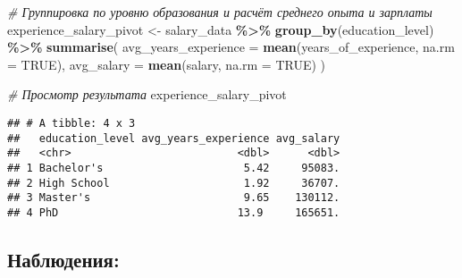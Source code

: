 \documentclass[
]{article}
\newenvironment{Shaded}{\begin{snugshade}}{\end{snugshade}}
\newcommand{\AttributeTok}[1]{\textcolor[rgb]{0.13,0.29,0.53}{#1}}
\newcommand{\CommentTok}[1]{\textcolor[rgb]{0.56,0.35,0.01}{\textit{#1}}}
\newcommand{\ConstantTok}[1]{\textcolor[rgb]{0.56,0.35,0.01}{#1}}
\newcommand{\FunctionTok}[1]{\textcolor[rgb]{0.13,0.29,0.53}{\textbf{#1}}}
\newcommand{\NormalTok}[1]{#1}
\newcommand{\OtherTok}[1]{\textcolor[rgb]{0.56,0.35,0.01}{#1}}
\newcommand{\SpecialCharTok}[1]{\textcolor[rgb]{0.81,0.36,0.00}{\textbf{#1}}}
\begin{document}
\begin{Shaded}
\begin{Highlighting}[]
\CommentTok{\# Группировка по уровню образования и расчёт среднего опыта и зарплаты}
\NormalTok{experience\_salary\_pivot }\OtherTok{\textless{}{-}}\NormalTok{ salary\_data }\SpecialCharTok{\%\textgreater{}\%}
  \FunctionTok{group\_by}\NormalTok{(education\_level) }\SpecialCharTok{\%\textgreater{}\%}
  \FunctionTok{summarise}\NormalTok{(}
    \AttributeTok{avg\_years\_experience =} \FunctionTok{mean}\NormalTok{(years\_of\_experience, }\AttributeTok{na.rm =} \ConstantTok{TRUE}\NormalTok{),}
    \AttributeTok{avg\_salary =} \FunctionTok{mean}\NormalTok{(salary, }\AttributeTok{na.rm =} \ConstantTok{TRUE}\NormalTok{)}
\NormalTok{  )}

\CommentTok{\# Просмотр результата}
\NormalTok{experience\_salary\_pivot}
\end{Highlighting}
\end{Shaded}

\begin{verbatim}
## # A tibble: 4 x 3
##   education_level avg_years_experience avg_salary
##   <chr>                          <dbl>      <dbl>
## 1 Bachelor's                      5.42     95083.
## 2 High School                     1.92     36707.
## 3 Master's                        9.65    130112.
## 4 PhD                            13.9     165651.
\end{verbatim}

\subsection{Наблюдения:}\label{ux43dux430ux431ux43bux44eux434ux435ux43dux438ux44f-15}
\end{document}
